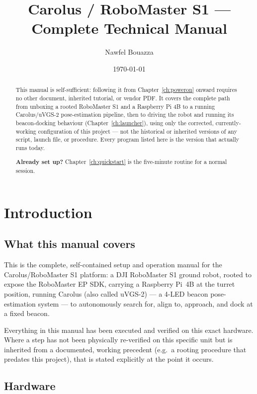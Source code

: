 \documentclass[11pt]{report}
\title{Carolus / RoboMaster S1 --- Complete Technical Manual}
\author{Nawfel Bouazza}
\date{\today}
\begin{document}
\maketitle

\begin{abstract}
This manual is self-sufficient: following it from Chapter~\ref{ch:poweron}
onward requires no other document, inherited tutorial, or vendor PDF. It
covers the complete path from unboxing a rooted RoboMaster S1 and a
Raspberry Pi 4B to a running Carolus/uVGS-2 pose-estimation pipeline, then
to driving the robot and running its beacon-docking behaviour
(Chapter~\ref{ch:launcher}), using only the corrected, currently-working
configuration of this project --- not the historical or inherited versions
of any script, launch file, or procedure. Every program listed here is the
version that actually runs today.

\textbf{Already set up?} Chapter~\ref{ch:quickstart} is the five-minute
routine for a normal session.
\end{abstract}

\tableofcontents

\chapter{Introduction}

\section{What this manual covers}

This is the complete, self-contained setup and operation manual for the
Carolus/RoboMaster S1 platform: a DJI RoboMaster S1 ground robot, rooted to
expose the RoboMaster EP SDK, carrying a Raspberry Pi~4B at the turret
position, running Carolus (also called uVGS-2) --- a 4-LED beacon
pose-estimation system --- to autonomously search for, align to, approach,
and dock at a fixed beacon.

Everything in this manual has been executed and verified on this exact
hardware. Where a step has not been physically re-verified on this specific
unit but is inherited from a documented, working precedent (e.g.\ a rooting
procedure that predates this project), that is stated explicitly at the
point it occurs.

\section{Hardware}
\end{document}
